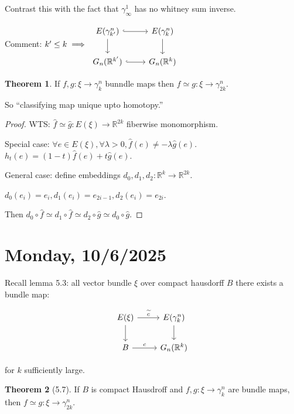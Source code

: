 \documentclass{article}
\theoremstyle{definition}
\newtheorem{theorem}{Theorem}
\begin{document}
    Contrast this with the fact that \(\gamma^1_\infty\) has no whitney sum inverse.

    Comment: \(k^{\prime} \leq k \implies \begin{tikzcd} E(\gamma^n_{k^{\prime}}) \ar[r, hook] \ar[d] & E(\gamma^n_k) \ar[d] \\ G_n(\mathbb{R}^{k^{\prime}})\ar[r, hook] & G_n(\mathbb{R}^k) \end{tikzcd}\) 

    \begin{theorem}
        If \(f,g: \xi \to \gamma^n_k\) bunndle maps then \(f \simeq g: \xi \to \gamma^n_{2k}\).

        So ``classifying map unique upto homotopy.''
    \end{theorem}

    \begin{proof}
        WTS: \(\hat{f} \simeq \hat{g} : E(\xi) \to \mathbb{R}^{2k}\) fiberwise monomorphism.
        
        Special case: \(\forall e\in E(\xi), \forall \lambda > 0, \hat{f}(e) \neq -\lambda \hat{g}(e)\). \(h_t(e) = (1-t) \hat{f}(e) + t \hat{g} (e)\).

        General case: define embeddings \(d_0, d_1, d_2:\mathbb{R}^k \to \mathbb{R}^{2k}\).

        \(d_0(e_i) = e_i, d_1(e_i) = e_{2i - 1}, d_2(e_i) = e_{2i}\).

        Then \(d_0 \circ \hat{f} \simeq d_1 \circ \hat{f} \simeq d_2 \circ  \hat{g} \simeq d_0 \circ \hat{g}\).
    \end{proof}

    \section*{Monday, 10/6/2025}
    
    Recall lemma 5.3: all vector bundle \(\xi\) over compact hausdorff \(B\) there exists a bundle map:

    \[
        \begin{tikzcd}
            E(\xi) \ar[r, "\widetilde{c}"] \ar[d] & E(\gamma^n_k) \ar[d] \\ B \ar[r,"c"] & G_n(\mathbb{R}^k)
        \end{tikzcd}
    \]

    for \(k\) sufficiently large.

    \begin{theorem}
        [5.7] If \(B\) is compact Hausdroff and \(f,g: \xi \to \gamma^n_k\) are bundle maps, then \(f\simeq g: \xi \to \gamma^n_{2k}\).
    \end{theorem}
\end{document}
